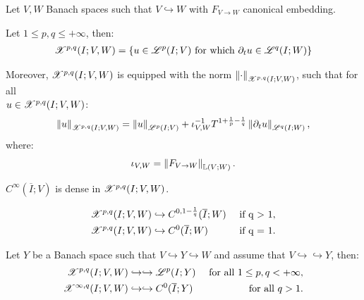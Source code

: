 Let $V, W$ Banach spaces such that $V \hookrightarrow W$ with $F_{V \rightarrow W}$ canonical embedding.

\begin{definition}[$\SpaceXpq{p}{q}(I; V, W)$]
    Let $1 \leq p, q \leq +\infty$, then:
    \begin{align}
        \mathscr{X}^{p, q}(I; V, W) = \left\{ u \in \mathscr{L}^{p}(I; V) \text{ for which } \partial_t u \in \mathscr{L}^{q}(I; W) \right\}
    \end{align}

    Moreover, $\SpaceXpq{p}{q}(I; V, W)$ is equipped with the norm $\left\lVert \cdot \right\rVert_{\mathscr{X}^{p, q}(I; V, W)}$, such that for all \\ $u \in \mathscr{X}^{p, q}(I; V, W)$:
    \begin{align}
        \left\lVert u \right\rVert_{\mathscr{X}^{p, q}(I; V, W)} = \left\lVert u \right\rVert_{\mathscr{L}^{p}(I; V)} + \iota_{V, W}^{-1}T^{1 + \frac{1}{p} - \frac{1}{q}} \left\lVert \partial_t u \right\rVert_{\mathscr{L}^{q}(I; W)},
    \end{align}
    where:
    \begin{align}
        \iota_{V, W} = \left\lVert F_{V \rightarrow W} \right\rVert_{\mathbb{L}(V;W)}.
    \end{align}
\end{definition}

\begin{theorem}
    $C^{\infty}(\overline{I}; V)$ is dense in $\SpaceXpq{p}{q}(I; V, W)$.
\end{theorem}

\begin{lemma}
    \begin{align}
        & \mathscr{X}^{p, q}(I; V, W) \hookrightarrow C^{0, 1 - \frac{1}{q}}(\overline{I}; W) & \text{ if q > 1}, \\
        & \mathscr{X}^{p, q}(I; V, W) \hookrightarrow C^{0}(\overline{I}; W) & \text{ if q = 1}.
    \end{align}
\end{lemma}

\begin{theorem}
    Let $Y$ be a Banach space such that $V \hookrightarrow Y \hookrightarrow W$ and assume that $V \hookrightarrow \hookrightarrow Y$, then:
    \begin{align}
        \mathscr{X}^{p, q}(I; V, W) &\hookrightarrow \hookrightarrow \mathscr{L}^{p}(I; Y) &\text{ for all } 1 \leq p, q < +\infty,\\
        \mathscr{X}^{\infty, q}(I; V, W) &\hookrightarrow \hookrightarrow C^0(\overline{I}; Y) &\text{ for all } q > 1.
    \end{align}
\end{theorem}

